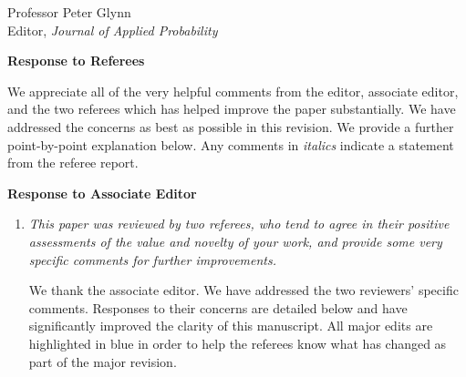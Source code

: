 \documentclass[11pt]{letter} %
\begin{document}

\begin{letter}{Professor
	Peter Glynn\\
	Editor, {\em Journal of Applied Probability}}



\signature{Walter Dempsey\\
University of Michigan\\
Department of Biostatistics\\
1415 Washington Heights\\
Ann Arbor, MI 48103} %


\vspace{5mm}

\newpage

{\bf Response to Referees}

We appreciate all of the very helpful comments from the editor, associate editor, and the two referees which has helped improve the paper substantially. We have addressed the concerns as best as possible in this revision. We provide a further point-by-point explanation below. Any comments in {\it italics} indicate a statement from the referee report.

{\bf Response to Associate Editor}
\begin{enumerate}
\item {\it This paper was reviewed by two referees, who tend to agree in their positive assessments of the value and novelty of your work, and provide some very specific comments for further improvements.}

\vspace{5mm}
We thank the associate editor.  We have addressed the two reviewers' specific comments.  Responses to their concerns are detailed below and have significantly improved the clarity of this manuscript.   All major edits are highlighted in blue in order to help the referees know what has changed as part of the major revision.
\vspace{5mm}


\end{enumerate}
\end{letter}
\end{document}

